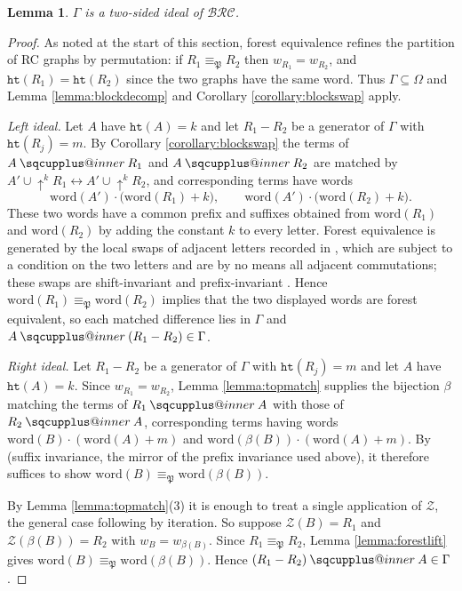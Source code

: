 \documentclass{amsart}
\makeatletter
\newcommand{\sqcupplus@inner}[2]{%
  \vcenter{\hbox{\ooalign{%
    \hfil$\m@th#1\sqcup$\hfil\cr
    \hfil\raisebox{0.15ex}{$\m@th#1\scriptscriptstyle+$}\hfil\cr
  }}}%
}
\newcommand{\sqcupplus}{\mathbin{\mathpalette\sqcupplus@inner\relax}}
\newtheorem{lemma}{Lemma}[subsection]
\theoremstyle{definition}
\theoremstyle{remark}
\numberwithin{equation}{subsection}
\newcommand{\shup}{{\uparrow}}
\newcommand{\wof}[1]{w_{#1}}
\newcommand{\zeromap}{\mathcal{Z}}
\newcommand{\hr}{\mathtt{ht}}
\newcommand{\BRC}{\mathcal{BRC}}
\newcommand{\forest}{\mathfrak{P}}
\makeatother
\begin{document}
\begin{lemma} \label{lemma:forestideal}
  $\Gamma$ is a two-sided ideal of $\BRC$.
\end{lemma}
\begin{proof}
  As noted at the start of this section, forest equivalence refines the partition of RC graphs by permutation: if $R_1\equiv_\forest R_2$ then $\wof{R_1}=\wof{R_2}$, and $\hr(R_1)=\hr(R_2)$ since the two graphs have the same word. Thus $\Gamma\subseteq\Omega$ and Lemma \ref{lemma:blockdecomp} and Corollary \ref{corollary:blockswap} apply.

  \emph{Left ideal.} Let $A$ have $\hr(A)=k$ and let $R_1-R_2$ be a generator of $\Gamma$ with $\hr(R_j)=m$. By Corollary \ref{corollary:blockswap} the terms of $A\sqcupplus R_1$ and $A\sqcupplus R_2$ are matched by $A'\cup\shup^{k}R_1\leftrightarrow A'\cup\shup^{k}R_2$, and corresponding terms have words
  $$\mathrm{word}(A')\cdot\bigl(\mathrm{word}(R_1)+k\bigr),\qquad \mathrm{word}(A')\cdot\bigl(\mathrm{word}(R_2)+k\bigr).$$
  These two words have a common prefix and suffixes obtained from $\mathrm{word}(R_1)$ and $\mathrm{word}(R_2)$ by adding the constant $k$ to every letter. Forest equivalence is generated by the local swaps of adjacent letters recorded in \cite[Proposition~5.8]{nadeau2024forest}, which are subject to a condition on the two letters and are by no means all adjacent commutations; these swaps are shift-invariant \cite[Proposition~5.8]{nadeau2024forest} and prefix-invariant \cite[Lemma~5.9]{nadeau2024forest}. Hence $\mathrm{word}(R_1)\equiv_\forest\mathrm{word}(R_2)$ implies that the two displayed words are forest equivalent, so each matched difference lies in $\Gamma$ and $A\sqcupplus(R_1-R_2)\in\Gamma$.

  \emph{Right ideal.} Let $R_1-R_2$ be a generator of $\Gamma$ with $\hr(R_j)=m$ and let $A$ have $\hr(A)=k$. Since $\wof{R_1}=\wof{R_2}$, Lemma \ref{lemma:topmatch} supplies the bijection $\beta$ matching the terms of $R_1\sqcupplus A$ with those of $R_2\sqcupplus A$, corresponding terms having words $\mathrm{word}(B)\cdot(\mathrm{word}(A)+m)$ and $\mathrm{word}(\beta(B))\cdot(\mathrm{word}(A)+m)$. By \cite[Lemma~5.9]{nadeau2024forest} (suffix invariance, the mirror of the prefix invariance used above), it therefore suffices to show $\mathrm{word}(B)\equiv_\forest\mathrm{word}(\beta(B))$.

  By Lemma \ref{lemma:topmatch}(3) it is enough to treat a single application of $\zeromap$, the general case following by iteration. So suppose $\zeromap(B)=R_1$ and $\zeromap(\beta(B))=R_2$ with $\wof B=\wof{\beta(B)}$. Since $R_1\equiv_\forest R_2$, Lemma \ref{lemma:forestlift} gives $\mathrm{word}(B)\equiv_\forest\mathrm{word}(\beta(B))$. Hence $(R_1-R_2)\sqcupplus A\in\Gamma$.
\end{proof}
\end{document}
